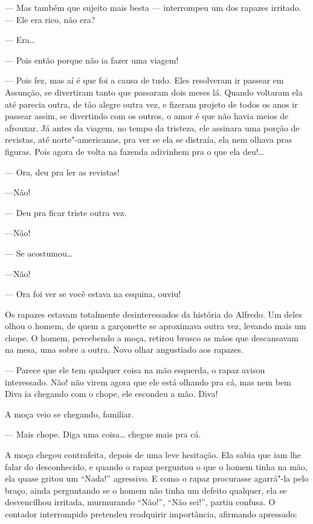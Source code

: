 \begin{linenumbers}
--- Mas também que sujeito mais besta --- interrompeu um dos rapazes
irritado. --- Ele era rico, não era?

--- Era\ldots{}

--- Pois então porque não ia fazer uma viagem!

--- Pois fez, mas aí é que foi a causa de tudo. Eles resolveram ir
passear em Assunção, se divertiram tanto que passaram dois meses lá.
Quando voltaram ela até parecia outra, de tão alegre outra vez, e
fizeram projeto de todos os anos ir passear assim, se divertindo com os
outros, o amor é que não havia meios de afrouxar. Já antes da viagem, no
tempo da tristeza, ele assinara uma porção de revistas, até
norte"-americanas, pra ver se ela se distraía, ela nem olhava pras
figuras. Pois agora de volta na fazenda adivinhem pra o que ela deu!\ldots{}

--- Ora, deu pra ler as revistas!

---Não!

--- Deu pra ficar triste outra vez.

---Não!

--- Se acostumou\ldots{}

---Não!

--- Ora foi ver se você estava na esquina, ouviu!

Os rapazes estavam totalmente desinteressados da história do Alfredo. Um
deles olhou o homem, de quem a garçonette se aproximava outra vez,
levando mais um chope. O homem, percebendo a moça, retirou brusco as
mãos que descansavam na mesa, uma sobre a outra. Novo olhar angustiado
aos rapazes.

--- Parece que ele tem qualquer coisa na mão esquerda, o rapaz avisou
interessado. Não! não virem agora que ele está olhando pra cá, mas nem
bem Diva ia chegando com o chope, ele escondeu a mão. Diva!

A moça veio se chegando, familiar.

--- Mais chope. Diga uma coisa\ldots{} chegue mais pra cá.

A moça chegou contrafeita, depois de uma leve hesitação. Ela sabia que
iam lhe falar do desconhecido, e quando o rapaz perguntou o que o homem
tinha na mão, ela quase gritou um ``Nada!'' agressivo. E como o rapaz
procurasse agarrá"-la pelo braço, ainda perguntando se o homem não tinha
um defeito qualquer, ela se desvencilhou irritada, murmurando ``Não!'',
``Não sei!'', partiu confusa. O contador interrompido pretendeu
readquirir importância, afirmando apressado:


\end{linenumbers}
